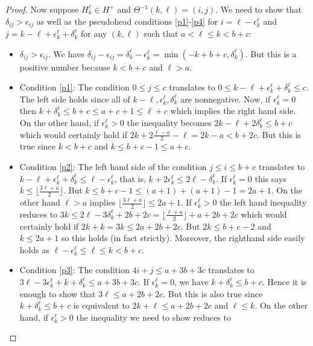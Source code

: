 \documentclass[11pt,reqno]{amsart}
\theoremstyle{definition}
\numberwithin{equation}{section}
\begin{document}
\begin{proof}
Now suppose $H_k^\ell \in H^+$ and $\Theta^{-1}(k,\ell)=(i,j)$.  We need to show that $\delta_{ij}>\epsilon_{ij}$ as well 
as  the pseudohead conditions \eqref{p1}-\eqref{p4} for $i=\ell-\epsilon_k^\ell$ and $j=k-\ell+\epsilon_k^{\ell}+\delta_k^\ell$ 
for any $(k,\ell)$ such that $a < \ell \leqslant k <b+c$:
\begin{itemize}
\item $\delta_{ij}>\epsilon_{ij}$. We have $\delta_{ij}-\epsilon_{ij}=\delta_k^\ell-\epsilon_k^\ell=\min(-k+b+c,\delta_k^\ell)$.
But this is a positive number because $k<b+c$ and $\ell>a$.
\item Condition \eqref{p1}: The condition $0 \leqslant j \leqslant c$ translates to $0 \leqslant k-\ell +\epsilon_k^\ell
+ \delta_k^\ell \leqslant c$. The left side holds since all of $k-\ell,\epsilon_k^\ell,\delta_k^\ell$ are nonnegative. Now, if 
$\epsilon_k^\ell=0$ then $k+\delta_k^\ell \leqslant b+c \leqslant a+c+1 \leq \ell+c$ which implies the right hand side.  
On the other hand, if $\epsilon_k^\ell>0$ the inequality becomes $2k-\ell+2\delta_k^\ell \leqslant b+c$ which would 
certainly hold if $2k +2\frac{\ell-a}{2}-\ell=2k-a<b+2c$. But this is true since $k<b+c$ and $k \leqslant b+c-1 \leqslant a+c$.
\item Condition \eqref{p2}: The left hand side of the condition $j\leqslant i \leqslant b+c$ translates to 
$ k-\ell+\epsilon_k^{\ell}+\delta_k^\ell \leqslant \ell-\epsilon_k^\ell$, that is, $k+2 \epsilon_k^\ell \leqslant 2\ell-\delta_k^\ell$.  
If $\epsilon_k^\ell=0$ this says $k \leqslant \lfloor\frac{3\ell+a}{2}\rfloor$. But 
$k \leqslant b+c-1 \leqslant (a+1) +(a+1) -1 =2a+1$.  
On the other hand $\ell>a$ implies $\lfloor\frac{3\ell+a}{2}\rfloor \leqslant 2a+1$. If $\epsilon_k^\ell>0$ the left hand inequality 
reduces to $3k \leqslant 2\ell-3\delta_k^\ell +2b+2c=\lfloor \frac{\ell+a}{2} \rfloor +a +2b +2c$ which would certainly hold 
if $2k+k=3k \leqslant 2a+2b+2c$.  But $2k \leqslant b+c-2$ and $k \leqslant 2a+1$ so this holds (in fact strictly).  
Moreover, the righthand side easily holds as $\ell-\epsilon_k^\ell \leqslant \ell \leqslant k <b+c$.
\item Condition \eqref{p3}: The condition $4i+j \leqslant a+3b+3c$ translates to $3\ell-3\epsilon_k^\ell +k+ \delta_k^\ell
 \leqslant a+3b+3c$.  If $\epsilon_k^\ell=0$, we have $k+ \delta_k^\ell \leqslant b+c$. Hence it is enough to show that
 $3\ell \leqslant a+2b+2c$.  But this is also true since $k+ \delta_k^\ell \leqslant b+c$ is equivalent to $2k+\ell \leqslant
 a+2b+2c$ and $\ell \leqslant k$. On the other hand, if $\epsilon_k^\ell>0$ the inequality we need to show reduces to 

\end{itemize}
\end{proof}
\end{document}
